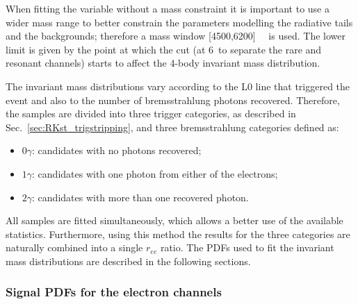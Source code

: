 When fitting the variable without a \jpsi mass constraint it is important to use a wider mass range to better constrain the 
parameters modelling the radiative tails and the backgrounds; therefore a mass window [4500,6200]~\mevcc~ is used. The lower limit 
is given by the point at which the \qsq cut (at 6~\gevgevcccc to separate the rare and resonant channels)
starts to affect the 4-body invariant mass distribution. 
%
%

The invariant mass distributions vary according to the
L0 line that triggered the event and also to the number of bremsstrahlung photons recovered.
Therefore, the samples are divided into three trigger categories, as described in
Sec.~\ref{sec:RKst_trigstripping}, and three bremsstrahlung categories defined as:
%
\begin{itemize}
\item $0\gamma$: candidates with no photons recovered;
\item $1\gamma$: candidates with one photon from either of the electrons;
\item $2\gamma$: candidates with more than one recovered photon.
\end{itemize}
%
All samples are fitted simultaneously, which allows a better use of the available statistics. 
Furthermore, using this method the results for the three categories are
naturally combined into a single $r_{ee}$ ratio.
%
The PDFs used to fit the invariant mass distributions are described in the following sections.



\subsubsection{Signal PDFs for the electron channels}
\label{sec:fit_ee_central}


